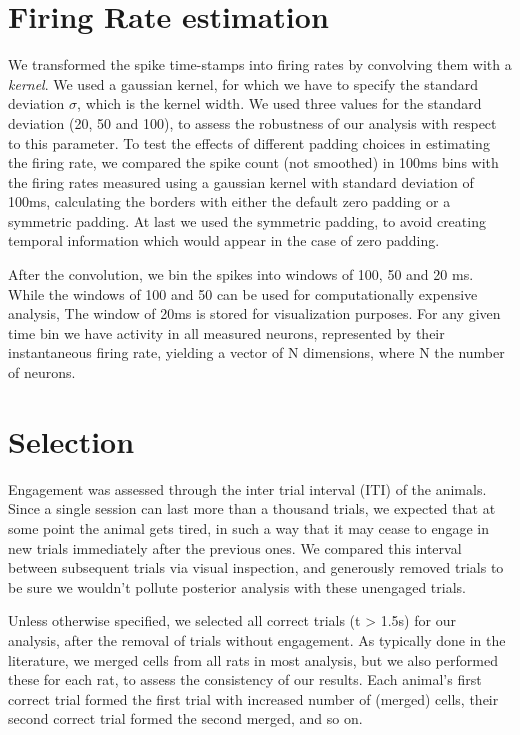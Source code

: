 \section{Firing Rate estimation}
We transformed the spike time-stamps into firing rates by convolving them with a \textit{kernel}. We used a gaussian kernel, for which we have to specify the standard deviation $\sigma$, which is the kernel width. We used three values for the standard deviation (20, 50 and 100), to assess the robustness of our analysis with respect to this parameter. To test the effects of different padding choices in estimating the firing rate, we compared the spike count (not smoothed) in 100ms bins with the firing rates measured using a gaussian kernel with standard deviation of 100ms, calculating the borders with either the default zero padding or a symmetric padding. At last we used the symmetric padding, to avoid creating temporal information which would appear in the case of zero padding.


After the convolution, we bin the spikes into windows of 100, 50 and 20 ms. While the windows of 100 and 50 can be used for computationally expensive analysis, The window of 20ms is stored for visualization purposes. For any given time bin we have activity in all measured neurons, represented by their instantaneous firing rate, yielding a vector of N dimensions, where N the number of neurons.

\section{Selection}
Engagement was assessed through the inter trial interval (ITI) of the animals. Since a single session can last more than a thousand trials, we expected that at some point the animal gets tired, in such a way that it may cease to engage in new trials immediately after the previous ones. We compared this interval between subsequent trials via visual inspection, and generously removed trials to be sure we wouldn't pollute posterior analysis with these unengaged trials.

Unless otherwise specified, we selected all correct trials (t > 1.5s) for our analysis, after the removal of trials without engagement. 
As typically done in the literature, we merged cells from all rats in most analysis, but we also performed these for each rat, to assess the consistency of our results. Each animal's first correct trial formed the first trial with increased number of (merged) cells, their second correct trial formed the second merged, and so on.

